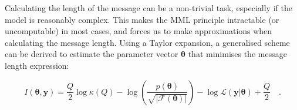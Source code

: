 \documentclass{elsarticle}
\newcommand{\vect}[1]{\boldsymbol{\mathbf{#1}}}
\renewcommand{\vec}[1]{\vect{#1}}
\def\datum{y}
\def\data{\vect{\datum}}
\def\likelihood{\mathcal{L}}
\newcommand{\fisher}[1]{\mathcal{F}\left(#1\right)}
\newcommand{\prior}[1]{p\left(#1\right)}
\begin{document}
\begin{itemize}
\end{itemize}



Calculating the length of the message can be a non-trivial task, especially
if the model is reasonably complex. This makes the MML principle intractable
(or uncomputable) in most cases, and forces us to make approximations when 
calculating the message length. Using a Taylor expansion, a generalised scheme
can be derived to estimate the parameter vector $\vec{\theta}$ that minimises
the message length expression\cite{WallaceFreeman1987}:

\begin{equation}
    I(\vec{\theta}, \vec{\data}) = \frac{Q}{2}\log{\kappa(Q)} - \log\left(\frac{\prior{\vec{\theta}}}{\sqrt{|\fisher{\vec{\theta}}|}}\right) - \log\likelihood\left(\vec{\data}|\vec{\theta}\right) + \frac{Q}{2} \quad .
    \label{eq:taylor}
\end{equation}
\end{document}

